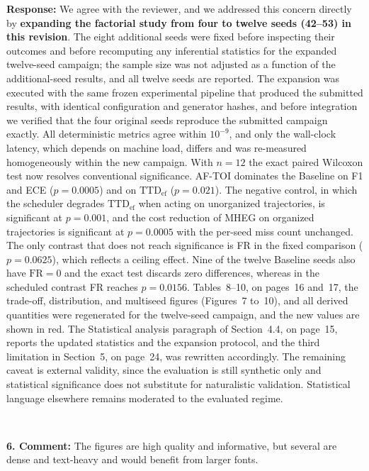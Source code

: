 \documentclass[1p,12pt,authoryear]{elsarticle}
\begin{document}
\vspace{2mm}
\noindent \textbf{Response:} We agree with the reviewer, and we addressed this concern directly by \textbf{expanding the factorial study from four to twelve seeds (42--53) in this revision}. The eight additional seeds were fixed before inspecting their outcomes and before recomputing any inferential statistics for the expanded twelve-seed campaign; the sample size was not adjusted as a function of the additional-seed results, and all twelve seeds are reported. The expansion was executed with the same frozen experimental pipeline that produced the submitted results, with identical configuration and generator hashes, and before integration we verified that the four original seeds reproduce the submitted campaign exactly. All deterministic metrics agree within $10^{-9}$, and only the wall-clock latency, which depends on machine load, differs and was re-measured homogeneously within the new campaign. With $n=12$ the exact paired Wilcoxon test now resolves conventional significance. \mbox{AF-TOI} dominates the Baseline on F1 and ECE ($p=0.0005$) and on $\mathrm{TTD}_{\mathrm{ef}}$ ($p=0.021$). The negative control, in which the scheduler degrades $\mathrm{TTD}_{\mathrm{ef}}$ when acting on unorganized trajectories, is significant at $p=0.001$, and the cost reduction of \mbox{MHEG} on organized trajectories is significant at $p=0.0005$ with the per-seed miss count unchanged. The only contrast that does not reach significance is FR in the fixed comparison ($p=0.0625$), which reflects a ceiling effect. Nine of the twelve Baseline seeds also have $\mathrm{FR}=0$ and the exact test discards zero differences, whereas in the scheduled contrast FR reaches $p=0.0156$. Tables~8--10, on pages~16 and~17, the trade-off, distribution, and multiseed figures (Figures~7 to~10), and all derived quantities were regenerated for the twelve-seed campaign, and the new values are shown in red. The Statistical analysis paragraph of Section~4.4, on page~15, reports the updated statistics and the expansion protocol, and the third limitation in Section~5, on page~24, was rewritten accordingly. The remaining caveat is external validity, since the evaluation is still synthetic only and statistical significance does not substitute for naturalistic validation. Statistical language elsewhere remains moderated to the evaluated regime.

~

\noindent \textbf{6. Comment:} The figures are high quality and informative, but several are dense and text-heavy and would benefit from larger fonts.
\end{document}

